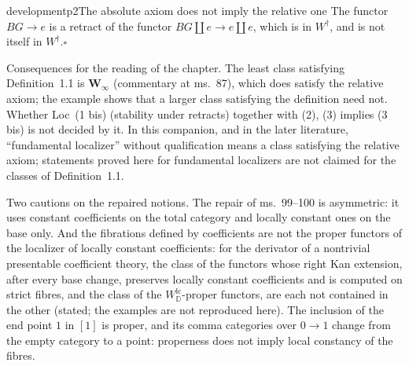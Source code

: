 \begin{dcomment}{development}{p2}{The absolute axiom does not imply the relative one}
The functor $BG\to e$ is a retract of the functor $BG\amalg e\to e\amalg e$, which is in $W^\dagger$, and is not itself in $W^\dagger$.\hfill$\square$

Consequences for the reading of the chapter. The least class satisfying Definition~1.1 is $\mathbf W_\infty$ (commentary at ms.~87), which does satisfy the relative axiom; the example shows that a larger class satisfying the definition need not. Whether Loc~(1 bis) (stability under retracts) together with (2), (3) implies (3 bis) is not decided by it. In this companion, and in the later literature, ``fundamental localizer'' without qualification means a class satisfying the relative axiom; statements proved here for fundamental localizers are not claimed for the classes of Definition~1.1.
\end{dcomment}

Two cautions on the repaired notions. The repair of ms.~99--100 is asymmetric: it uses constant coefficients on the total category and locally constant ones on the base only. And the fibrations defined by coefficients are not the proper functors of the localizer of locally constant coefficients: for the derivator of a nontrivial presentable coefficient theory, the class of the functors whose right Kan extension, after every base change, preserves locally constant coefficients and is computed on strict fibres, and the class of the $W^{\mathrm{lc}}_{\mathbb D}$-proper functors, are each not contained in the other (stated; the examples are not reproduced here). The inclusion of the end point $1$ in $[1]$ is proper, and its comma categories over $0\to1$ change from the empty category to a point: properness does not imply local constancy of the fibres.

